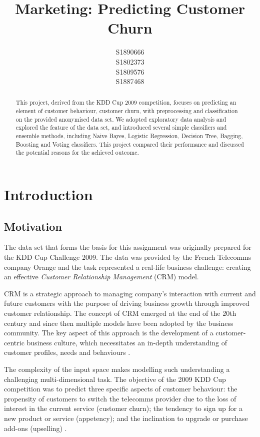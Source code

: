 \documentclass{article}
\title{Marketing: Predicting Customer Churn}
\author{
  S1890666\\
  \And
  S1802373\\
 \And
  S1809576\\
 \And
  S1887468\\
}
\begin{document}
\maketitle

\begin{abstract}
 
This project, derived from the KDD Cup 2009 competition, focuses on predicting an element of customer behaviour, customer churn, with preprocessing and classification on the provided anonymised data set.
We adopted exploratory data analysis and explored the feature of the data set, and introduced several simple classifiers and ensemble methods, including Naive Bayes, Logistic Regression, Decision Tree, Bagging, Boosting and Voting classifiers.
This project compared their performance and discussed the potential reasons for the achieved outcome.
\end{abstract}

\section{Introduction}
\subsection{Motivation}
The data set that forms the basis for this assignment was originally prepared for the KDD Cup Challenge 2009.
The data was provided by the French Telecomms company Orange and the task represented a real-life business challenge: creating an effective \emph{Customer Relationship Management} (CRM) model.

CRM is a strategic approach to managing company's interaction with current and future customers with the purpose of driving business growth through improved customer relationship.
The concept of CRM emerged at the end of the 20th century and since then multiple models have been adopted by the business community.
The key aspect of this approach is the development of a customer-centric business culture, which necessitates an in-depth understanding of customer profiles, needs and behaviours \cite{buttle2009customer}.

The complexity of the input space makes modelling such understanding a challenging multi-dimensional task.
The objective of the 2009 KDD Cup competition was to predict three specific aspects of customer behaviour: the propensity of customers to switch the telecomms provider due to the loss of interest in the current service (customer churn); the tendency to sign up for a new product or service (appetency); and the inclination to upgrade or purchase add-ons (upselling) \cite{guyon2009analysis}.
\end{document}

